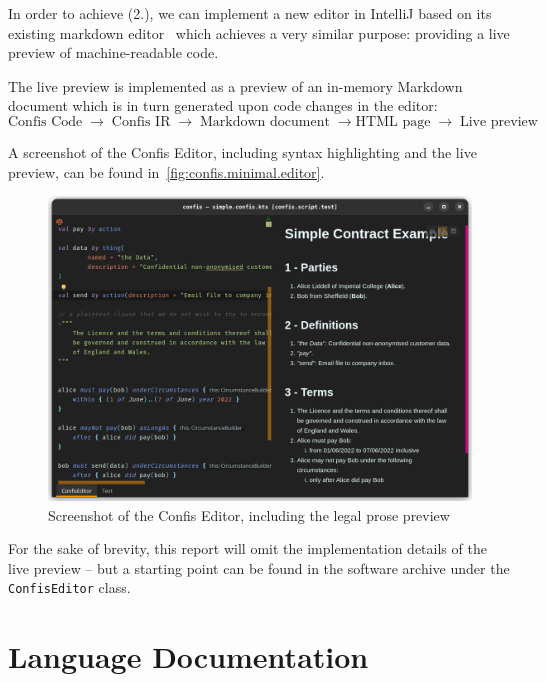 In order to achieve (2.), we can implement a new editor in IntelliJ based on its existing markdown editor~\cite{ideaMarkdownPreview} which achieves a very similar purpose: providing a live preview of machine-readable code.

The live preview is implemented as a preview of an in-memory Markdown document which is in turn generated upon code changes in the editor:
\begin{equation*}
    \text{Confis Code}\; \to\; \text{Confis IR}\; \to\; \text{Markdown document}\; \to \text{HTML page}\; \to\; \text{Live preview}
\end{equation*}

A screenshot of the Confis Editor, including syntax highlighting and the live preview, can be found in~\autoref{fig:confis.minimal.editor}.

\begin{figure}[h]
    \centering
    \includegraphics[width=\textwidth]{figures/simple.confis.editor}
    \caption{Screenshot of the Confis Editor, including the legal prose preview}
    \label{fig:confis.minimal.editor}
\end{figure}



For the sake of brevity, this report will omit the implementation details of the live preview -- but a starting point can be found in the software archive under the \texttt{ConfisEditor} class.


\section{Language Documentation}\label{sec:language-documentation}

